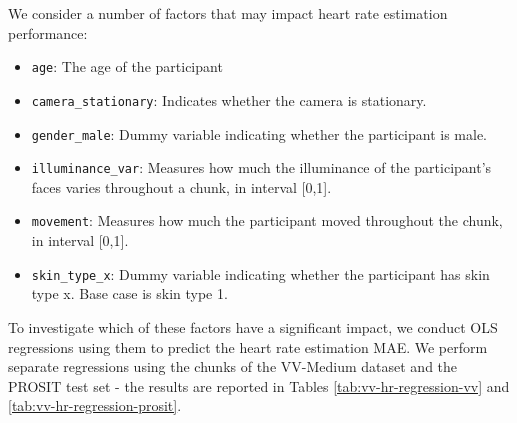 \documentclass{article}
\begin{document}
We consider a number of factors that may impact heart rate estimation performance:

\begin{itemize}
	\item \texttt{age}: The age of the participant
	\item \texttt{camera\_stationary}: Indicates whether the camera is stationary.
	\item \texttt{gender\_male}: Dummy variable indicating whether the participant is male.
	\item \texttt{illuminance\_var}: Measures how much the illuminance of the participant's faces varies throughout a chunk, in interval [0,1].
	\item \texttt{movement}: Measures how much the participant moved throughout the chunk, in interval [0,1].
	\item \texttt{skin\_type\_x}: Dummy variable indicating whether the participant has skin type x. Base case is skin type 1.
\end{itemize}

To investigate which of these factors have a significant impact, we conduct OLS regressions using them to predict the heart rate estimation MAE.
We perform separate regressions using the chunks of the VV-Medium dataset and the PROSIT test set - the results are reported in Tables \ref{tab:vv-hr-regression-vv} and \ref{tab:vv-hr-regression-prosit}.
\end{document}
